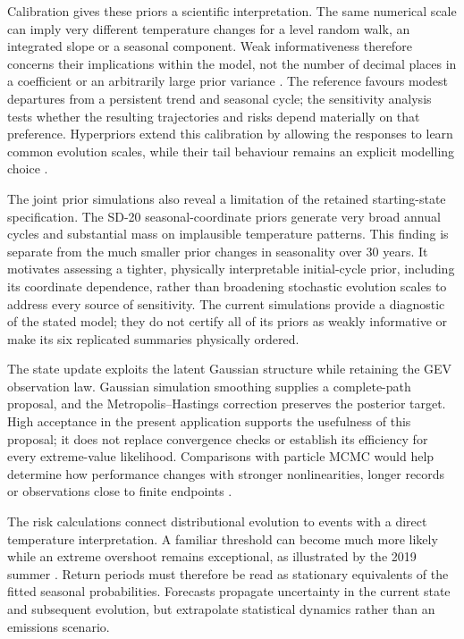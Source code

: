 \documentclass[11pt,a4paper]{article}
\begin{document}
Calibration gives these priors a scientific interpretation. The same numerical
scale can imply very different temperature changes for a level random walk,
an integrated slope or a seasonal component. Weak informativeness therefore
concerns their implications within the model, not the number of decimal
places in a coefficient or an arbitrarily large prior variance
\citep{gelman2017prior,gabry2019}. The reference favours modest departures
from a persistent trend and seasonal cycle; the sensitivity analysis tests
whether the resulting trajectories and risks depend materially on that
preference. Hyperpriors extend this calibration by allowing the responses
to learn common evolution scales, while their tail behaviour remains an
explicit modelling choice \citep{gelman2006}.

The joint prior simulations also reveal a limitation of the retained
starting-state specification. The SD-20 seasonal-coordinate priors generate
very broad annual cycles and substantial mass on implausible temperature
patterns. This finding is separate from the much smaller prior changes in
seasonality over 30 years. It motivates assessing a tighter, physically
interpretable initial-cycle prior, including its coordinate dependence,
rather than broadening stochastic evolution scales to address every source
of sensitivity. The current simulations provide a diagnostic of the stated
model; they do not certify all of its priors as weakly informative or make
its six replicated summaries physically ordered.
	
	The state update exploits the latent Gaussian structure while retaining the
	GEV observation law. Gaussian simulation smoothing supplies a complete-path
	proposal, and the Metropolis--Hastings correction preserves the posterior
	target. High acceptance in the present application supports the usefulness
	of this proposal; it does not replace convergence checks or establish its
	efficiency for every extreme-value likelihood. Comparisons with particle
	MCMC would help determine how performance changes with stronger nonlinearities,
	longer records or observations close to finite endpoints
	\citep{andrieu2010,lindsten2014}.
	
	The risk calculations connect distributional evolution to events with a
	direct temperature interpretation. A familiar threshold can become much more
	likely while an extreme overshoot remains exceptional, as illustrated by
	the 2019 summer \citep{fischer2025}. Return periods must therefore be read
	as stationary equivalents of the fitted seasonal probabilities. Forecasts
	propagate uncertainty in the current state and subsequent evolution, but
	extrapolate statistical dynamics rather than an emissions scenario.
	
\end{document}
